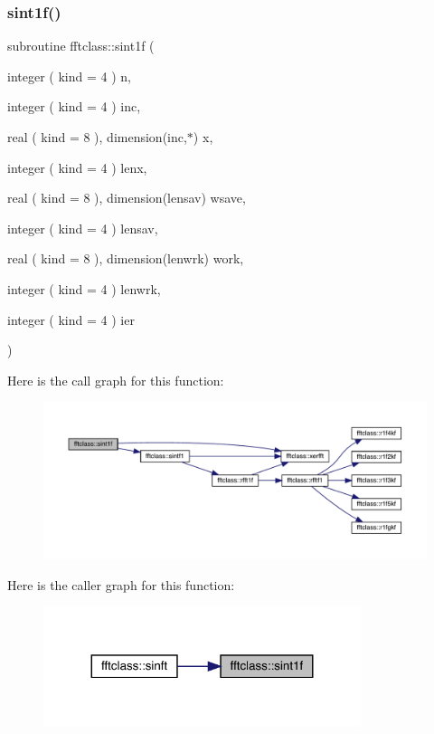 \subsubsection{\texorpdfstring{sint1f()}{sint1f()}}
{\footnotesize\ttfamily subroutine fftclass\+::sint1f (\begin{DoxyParamCaption}\item[{integer ( kind = 4 )}]{n,  }\item[{integer ( kind = 4 )}]{inc,  }\item[{real ( kind = 8 ), dimension(inc,$\ast$)}]{x,  }\item[{integer ( kind = 4 )}]{lenx,  }\item[{real ( kind = 8 ), dimension(lensav)}]{wsave,  }\item[{integer ( kind = 4 )}]{lensav,  }\item[{real ( kind = 8 ), dimension(lenwrk)}]{work,  }\item[{integer ( kind = 4 )}]{lenwrk,  }\item[{integer ( kind = 4 )}]{ier }\end{DoxyParamCaption})}

Here is the call graph for this function\+:\nopagebreak
\begin{figure}[H]
\begin{center}
\leavevmode
\includegraphics[width=350pt]{namespacefftclass_a6ae22ff215b2e962b410eb1b9c4860d7_cgraph}
\end{center}
\end{figure}
Here is the caller graph for this function\+:\nopagebreak
\begin{figure}[H]
\begin{center}
\leavevmode
\includegraphics[width=263pt]{namespacefftclass_a6ae22ff215b2e962b410eb1b9c4860d7_icgraph}
\end{center}
\end{figure}
\mbox{\label{namespacefftclass_ae156ccdcf953af967a42d20df0ddb725}} 
